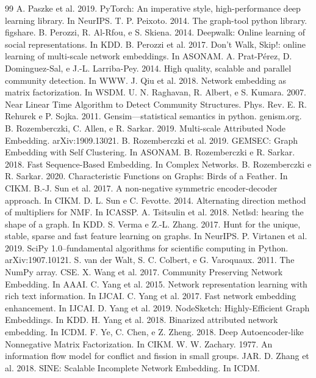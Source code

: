 \documentclass[sigconf]{acmart}
\begin{document}
\begin{thebibliography}{99}
 A. Paszke et al. 2019. PyTorch: An imperative style, high-performance deep learning library. In NeurIPS.
 T. P. Peixoto. 2014. The graph-tool python library. figshare.
 B. Perozzi, R. Al-Rfou, e S. Skiena. 2014. Deepwalk: Online learning of social representations. In KDD.
 B. Perozzi et al. 2017. Don't Walk, Skip!: online learning of multi-scale network embeddings. In ASONAM.
 A. Prat-Pérez, D. Dominguez-Sal, e J.-L. Larriba-Pey. 2014. High quality, scalable and parallel community detection. In WWW.
 J. Qiu et al. 2018. Network embedding as matrix factorization. In WSDM.
 U. N. Raghavan, R. Albert, e S. Kumara. 2007. Near Linear Time Algorithm to Detect Community Structures. Phys. Rev. E.
 R. Rehurek e P. Sojka. 2011. Gensim---statistical semantics in python. genism.org.
 B. Rozemberczki, C. Allen, e R. Sarkar. 2019. Multi-scale Attributed Node Embedding. arXiv:1909.13021.
 B. Rozemberczki et al. 2019. GEMSEC: Graph Embedding with Self Clustering. In ASONAM.
 B. Rozemberczki e R. Sarkar. 2018. Fast Sequence-Based Embedding. In Complex Networks.
 B. Rozemberczki e R. Sarkar. 2020. Characteristic Functions on Graphs: Birds of a Feather. In CIKM.
 B.-J. Sun et al. 2017. A non-negative symmetric encoder-decoder approach. In CIKM.
 D. L. Sun e C. Fevotte. 2014. Alternating direction method of multipliers for NMF. In ICASSP.
 A. Tsitsulin et al. 2018. Netlsd: hearing the shape of a graph. In KDD.
 S. Verma e Z.-L. Zhang. 2017. Hunt for the unique, stable, sparse and fast feature learning on graphs. In NeurIPS.
 P. Virtanen et al. 2019. SciPy 1.0--fundamental algorithms for scientific computing in Python. arXiv:1907.10121.
 S. van der Walt, S. C. Colbert, e G. Varoquaux. 2011. The NumPy array. CSE.
 X. Wang et al. 2017. Community Preserving Network Embedding. In AAAI.
 C. Yang et al. 2015. Network representation learning with rich text information. In IJCAI.
 C. Yang et al. 2017. Fast network embedding enhancement. In IJCAI.
 D. Yang et al. 2019. NodeSketch: Highly-Efficient Graph Embeddings. In KDD.
 H. Yang et al. 2018. Binarized attributed network embedding. In ICDM.
 F. Ye, C. Chen, e Z. Zheng. 2018. Deep Autoencoder-like Nonnegative Matrix Factorization. In CIKM.
 W. W. Zachary. 1977. An information flow model for conflict and fission in small groups. JAR.
 D. Zhang et al. 2018. SINE: Scalable Incomplete Network Embedding. In ICDM.

\end{thebibliography}
\end{document}

